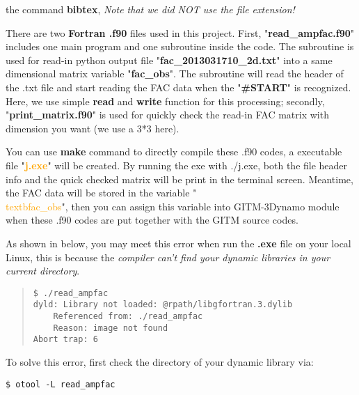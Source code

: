 \documentclass[12pt, letterpaper]{article} %
\begin{document}
the command \textbf{bibtex}, \emph{Note that we did NOT use the file extension!}  

\noindent There are two \textbf{Fortran .f90} files used in this project. First, "\textbf{read\_{}ampfac.f90}" includes one main program and one subroutine inside the code. The subroutine is used for read-in python output file "\textbf{fac\_{}2013031710\_{}2d.txt}" into a same dimensional matrix variable "\textbf{fac\_{}obs}". The subroutine will read the header of the .txt file and start reading the FAC data when the "\textbf{\#START}" is recognized. Here, we use simple \textbf{read} and \textbf{write} function for this processing; secondly, "\textbf{print\_{}matrix.f90}" is used for quickly check the read-in FAC
matrix with dimension you want (we use a 3*3 here). 

\noindent You can use \textbf{make} command to directly compile these .f90 codes, a executable file "\textcolor{orange}{\textbf{j.exe}}" will be created. By running the exe  with ./j.exe, both the file header info and the quick checked matrix will be print in the terminal screen. Meantime, the FAC data will be stored in the variable "\textcolor{orange}{\\textbf{ac\_{}obs}}", then you can assign this variable into GITM-3Dynamo module when these .f90 codes are put together with the GITM source codes.

\noindent As shown in below, you may meet this error when run the \textbf{.exe} file on your local Linux, this is because the \emph{compiler can't find your dynamic libraries in your current directory}.

\begin{quote}  %
\begin{verbatim}
$ ./read_ampfac
dyld: Library not loaded: @rpath/libgfortran.3.dylib
	Referenced from: ./read_ampfac
	Reason: image not found
Abort trap: 6
\end{verbatim} %
\end{quote} %

\noindent To solve this error, first check the directory of your dynamic library via:

\begin{verbatim}
$ otool -L read_ampfac
\end{verbatim} %
\end{document}
